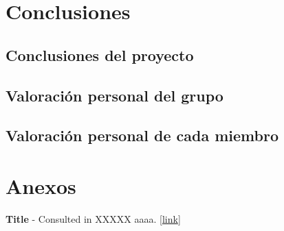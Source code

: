 \documentclass[a4paper]{article}
\begin{document}
\section{Conclusiones}
	\subsection{Conclusiones del proyecto}
	\subsection{Valoración personal del grupo}
	\subsection{Valoración personal de cada miembro}
\section{Anexos}

\newpage
\begin{thebibliography}{99} 
 \textbf{Title} - Consulted in XXXXX aaaa. [\url{link}]

\end{thebibliography}
\end{document}
